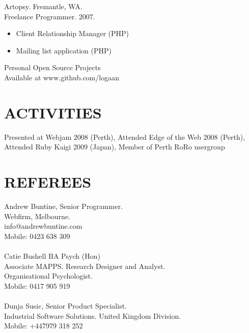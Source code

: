 \documentclass[margin]{res}
\begin{document}
\begin{resume}
   Artopsy. Fremantle, WA. \\
    Freelance Programmer. 2007.
 \begin{itemize}
  \item Client Relationship Manager (PHP)
  \item Mailing list application (PHP)
  \end{itemize} 

  Personal Open Source Projects \\
  Available at www.github.com/logaan

  \section{ACTIVITIES}
  Presented at Webjam 2008 (Perth), Attended Edge of the Web 2008 (Perth), Attended
  Ruby Kaigi 2009 (Japan), Member of Perth RoRo usergroup
  
  \section{REFEREES}
  Andrew Buntine, Senior Programmer. \\
  Webfirm, Melbourne. \\
  info@andrewbuntine.com \\
  Mobile: 0423 638 309 \\
  \\
  Catie Bushell BA Psych (Hon) \\
  Associate MAPPS. Research Designer and Analyst. \\
  Organisational Psychologist. \\
  Mobile: 0417 905 919 \\
  \\
  Dunja Susic, Senior Product Specialist. \\
  Industrial Software Solutions. United Kingdom Division. \\
  Mobile: +447979 318 252
  
\end{resume} 
\end{document}
